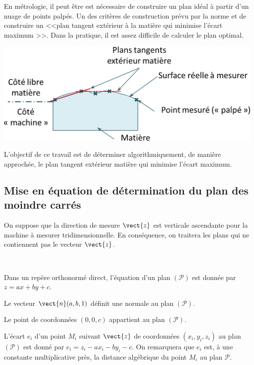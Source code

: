 En métrologie, il peut être est nécessaire de construire un plan idéal à partir d'un nuage de points palpés. Un des critères de construction prévu par la norme et de construire un <<plan tangent extérieur à la matière qui minimise l'écart maximum >>. Dans la pratique, il est assez difficile de calculer le plan optimal. 


\begin{center}
\includegraphics[width=.7\textwidth]{images/plan_tgt}
\end{center}

\begin{obj}
L'objectif de ce travail est de déterminer algorithmiquement, de manière approchée, le plan tangent extérieur matière qui minimise l'écart maximum. 
\end{obj}
\fi




\subsection{Mise en équation de détermination du plan des moindre carrés}
\ifprof
\else

On suppose que la direction de mesure $\vect{z}$ est verticale ascendante pour la machine à mesurer tridimensionnelle. En conséquence, on traitera les plans qui ne contiennent pas le vecteur $\vect{z}$.

\begin{rappel} ~\\ \vspace{-.25cm}

Dans un repère orthonormé direct, l'équation d'un plan $\left( \mathcal{P}\right)$ est donnée par $z=ax+by+c$.

Le vecteur $\vect{n}(a,b,1)$ définit une normale au plan $\left( \mathcal{P}\right)$.

Le point de coordonnées $(0,0,c)$ appartient au plan $\left( \mathcal{P}\right)$.

\end{rappel}



L'écart $e_i$ d'un point  $M_i$ suivant $\vect{z}$ de coordonnées $\left(x_i,y_i,z_i\right)$ au plan $\left( \mathcal{P}\right)$ est donné par 
$e_i = z_i -ax_i -by_i -c$.
On remarquera que $e_i$ est, à une constante multiplicative près, la distance algébrique du point $M_i$ au plan $\mathcal{P}$.

